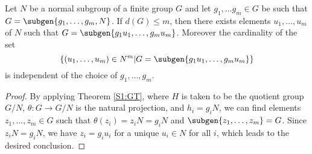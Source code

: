 \begin{theorem}
    \label{GaschutzT}
    Let $N$ be a normal subgroup of a finite group $G$ and let $g_1, \ldots  g_m \in G$ be such that $G = \subgen{g_1, \ldots , g_m, N}$. 
    If $d(G) \le m$, then there exists elements $u_1, \ldots , u_m$ of $N$ such that $G = \subgen{g_1u_1, \ldots , g_mu_m}$. 
    Moreover the cardinality of the set $$\left\{(u_1,\ldots ,u_m) \in N^m | G = \subgen{g_1u_1, \ldots , g_mu_m} \right\}$$ is independent of the choice of $g_1, \ldots , g_m$.
\end{theorem}
\begin{proof}
By applying Theorem \ref{S1:GT}, where $H$ is taken to be the quotient group $G/N$, $\theta \colon G \rightarrow G/N$ is the natural projection, and $h_i = g_iN$, we can find elements $z_1, \ldots , z_m \in G$ such that $\theta(z_i) = z_iN = g_iN$ and $\subgen{z_1, \ldots , z_m} = G$. Since $z_iN = g_iN$, we have $z_i = g_iu_i$ for a unique $u_i \in N$ for all $i$, which leads to the desired conclusion.
\end{proof}

